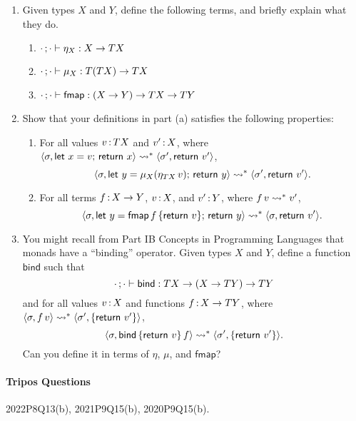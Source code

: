 \documentclass[11pt,a4paper,twoside]{article}
\begin{document}
\begin{enumerate}[label=(\alph*)]
  \item Given types $X$ and $Y$, define the following terms, and briefly explain what they do.
    \begin{enumerate}[label=(\roman*)]
      \item $\cdot\, ; \cdot \vdash \eta_X : X \to TX$
      \item $\cdot\, ; \cdot \vdash \mu_{X} : T(TX) \to TX$
      \item $\cdot\, ; \cdot \vdash \mathsf{fmap} : (X \to Y) \to TX \to TY$
    \end{enumerate}

  \item Show that your definitions in part (a) satisfies the following properties:
    \begin{enumerate}[label=(\roman*)]
      \item For all values $v \,{:}\, TX$ and $v' \,{:}\, X$, where 
      $\langle \sigma, \mathsf{let}\ x = v;\, \mathsf{return}\ x \rangle \rightsquigarrow^* \langle \sigma', \mathsf{return}\ v' \rangle$,
        \[
          \langle \sigma, \mathsf{let}\ y = \mu_X(\eta_{TX} \, v);\, \mathsf{return}\ y \rangle
            \rightsquigarrow^*
          \langle \sigma', \mathsf{return}\ v' \rangle.
        \]

      \item For all terms $f \,{:}\, X \to Y$, $v \,{:}\, X$, and $v' \,{:}\, Y$, where $f \, v \rightsquigarrow^* v'$,
        \[
          \langle \sigma, \mathsf{let}\ y = \mathsf{fmap} \, f \, \{\mathsf{return}\ v\};\, \mathsf{return}\ y \rangle
            \rightsquigarrow^* 
          \langle \sigma, \mathsf{return}\ v' \rangle.
        \]
      
    \end{enumerate}

    \item You might recall from Part IB Concepts in Programming Languages that monads have a ``binding'' operator.
    Given types $X$ and $Y$, define a function $\mathsf{bind}$ such that
      \[ \cdot\, ; \cdot \vdash \mathsf{bind} : TX \to (X \to TY) \to TY \]
    and for all values $v \,{:}\, X$ and functions $f \,{:}\, X \to TY$,
    where $\langle \sigma, f \, v \rangle \rightsquigarrow^* \langle \sigma', \{\mathsf{return}\ v'\} \rangle$,
      \[ 
        \langle \sigma, \mathsf{bind} \, \{\mathsf{return}\ v\} \, f \rangle 
          \rightsquigarrow^*
        \langle \sigma', \{\mathsf{return}\ v'\} \rangle.
      \]
    Can you define it in terms of $\eta$, $\mu$, and $\mathsf{fmap}$?
\end{enumerate}

\paragraph{Tripos Questions} 2022P8Q13(b), 2021P9Q15(b), 2020P9Q15(b).
\end{document}

